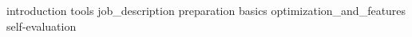 \documentclass[crop=false]{standalone}
\begin{document}
  \thispagestyle{sectionstyle}
  \tableofcontents
  \cleardoublepage

  \pagestyle{mainstyle}
  \thispagestyle{sectionstyle}
  {introduction}
  {tools}
  {job_description}
  {preparation}
  {basics}
  {optimization_and_features}
  {self-evaluation}
\end{document}
